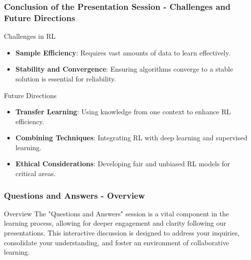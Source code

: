\documentclass[aspectratio=169]{beamer}
\begin{document}
\begin{frame}[fragile]
    \frametitle{Conclusion of the Presentation Session - Challenges and Future Directions}
    \begin{block}{Challenges in RL}
        \begin{itemize}
            \item \textbf{Sample Efficiency}: Requires vast amounts of data to learn effectively.
            \item \textbf{Stability and Convergence}: Ensuring algorithms converge to a stable solution is essential for reliability.
        \end{itemize}
    \end{block}

    \begin{block}{Future Directions}
        \begin{itemize}
            \item \textbf{Transfer Learning}: Using knowledge from one context to enhance RL efficiency.
            \item \textbf{Combining Techniques}: Integrating RL with deep learning and supervised learning.
            \item \textbf{Ethical Considerations}: Developing fair and unbiased RL models for critical areas.
        \end{itemize}
    \end{block}
\end{frame}

\begin{frame}[fragile]
    \frametitle{Questions and Answers - Overview}
    \begin{block}{Overview}
        The "Questions and Answers" session is a vital component in the learning process, allowing for deeper engagement and clarity following our presentations. This interactive discussion is designed to address your inquiries, consolidate your understanding, and foster an environment of collaborative learning.
    \end{block}
\end{frame}
\end{document}
